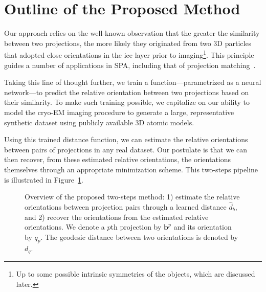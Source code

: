 \section{Outline of the Proposed Method}
\label{sec:outline}

Our approach relies on the well-known observation that the greater the similarity between two projections, the more likely they originated from two 3D particles that adopted close orientations in the ice layer prior to imaging\footnote{Up to some possible intrinsic symmetries of the objects, which are discussed later.}. This principle guides a number of applications in SPA, including that of projection matching~\cite{penczek1994ribosome}.

Taking this line of thought further, we train a function---parametrized as a neural network---to predict the relative orientation between two projections based on their similarity. To make such training possible, we capitalize on our ability to model the cryo-EM imaging procedure to generate a large, representative synthetic dataset using publicly available 3D atomic models.

Using this trained distance function, we can estimate the relative orientations between pairs of projections in any real dataset. Our postulate is that we can then recover, from these estimated relative orientations, the orientations themselves through an appropriate minimization scheme. This two-steps pipeline is illustrated in Figure~\ref{fig:overview-pipeline}. \\ 

\begin{figure}[h!]
    \center
    \caption{Overview of the proposed two-steps method: 1) estimate the relative orientations between projection pairs through a learned distance $\widehat{d}_b$, and 2) recover the orientations from the estimated relative orientations. We denote a $p$th projection by $\mathbf{b}^p$ and its orientation by $q_p$. The geodesic distance between two orientations is denoted by $d_q$.}
    \label{fig:overview-pipeline}
\end{figure}

